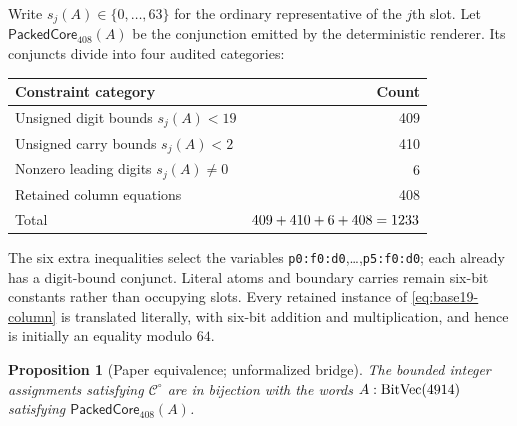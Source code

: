 \documentclass[11pt,twoside]{article}
\newtheorem{proposition}[definition]{Proposition}
\theoremstyle{remark}
\newcommand{\Core}{\ensuremath{\mathcal{C}^{\circ}}}
\begin{document}
Write $s_j(A)\in\{0,\ldots,63\}$ for the ordinary representative of the
$j$th slot.  Let $\mathsf{PackedCore}_{408}(A)$ be the conjunction emitted by
the deterministic renderer.  Its \PackedConstraintCount{} conjuncts divide
into four audited categories:
\begin{center}
  \begin{tabular}{@{}lr@{}}
    \toprule
    Constraint category & Count \\
    \midrule
    Unsigned digit bounds $s_j(A)<19$ & 409 \\
    Unsigned carry bounds $s_j(A)<2$ & 410 \\
    Nonzero leading digits $s_j(A)\neq0$ & 6 \\
    Retained column equations & 408 \\
    \midrule
    Total & $409+410+6+408=1233$ \\
    \bottomrule
  \end{tabular}
\end{center}
The six extra inequalities select the variables
\texttt{p0:f0:d0},\ldots,\texttt{p5:f0:d0}; each already has a digit-bound
conjunct.  Literal atoms and boundary carries remain six-bit constants rather
than occupying slots.  Every retained instance of
\cref{eq:base19-column} is translated literally, with six-bit addition and
multiplication, and hence is initially an equality modulo $64$.

\begin{proposition}[Paper equivalence; unformalized bridge]
\label{prop:packed-equivalence}
The bounded integer assignments satisfying $\Core$ are in bijection with the
words $A:\operatorname{BitVec}(4914)$ satisfying
$\mathsf{PackedCore}_{408}(A)$.
\end{proposition}
\end{document}
